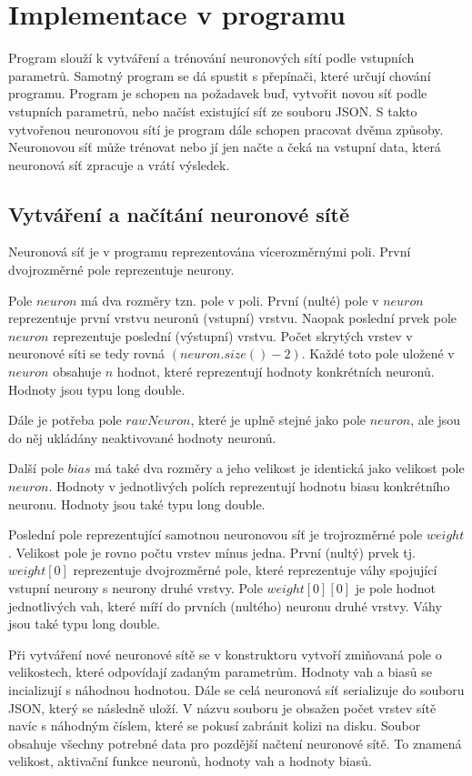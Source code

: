 \section{Implementace v programu}
Program slouží k vytváření a trénování neuronových sítí podle vstupních parametrů.
Samotný program se dá spustit s přepínači, které určují chování programu.
Program je schopen na požadavek buď, vytvořit novou síť podle vstupních parametrů, nebo načíst existující síť ze souboru JSON.
S takto vytvořenou neuronovou sítí je program dále schopen pracovat dvěma způsoby.
Neuronovou síť může trénovat nebo jí jen načte a čeká na vstupní data, která neuronová síť zpracuje a vrátí výsledek.

\subsection{Vytváření a načítání neuronové sítě}
Neuronová síť je v programu reprezentována vícerozměrnými poli. První dvojrozměrné pole reprezentuje neurony.

Pole \(neuron\) má dva rozměry tzn. pole v poli.
První (nulté) pole v \(neuron\) reprezentuje první vrstvu neuronů (vstupní) vrstvu.
Naopak poslední prvek pole \(neuron\) reprezentuje poslední (výstupní) vrstvu.
Počet skrytých vrstev v neuronové síti se tedy rovná \((neuron.size() - 2)\).
Každé toto pole uložené v \(neuron\) obsahuje \(n\) hodnot, které reprezentují hodnoty konkrétních neuronů. Hodnoty jsou typu long double.

Dále je potřeba pole \(rawNeuron\), které je uplně stejné jako pole \(neuron\), ale jsou do něj ukládány neaktivované hodnoty neuronů.

Další pole \(bias\) má také dva rozměry a jeho velikost je identická jako velikost pole \(neuron\).
Hodnoty v jednotlivých polích reprezentují hodnotu biasu konkrétního neuronu. Hodnoty jsou také typu long double.

Poslední pole reprezentující samotnou neuronovou síť je trojrozměrné pole \(weight\). Velikost pole je rovno počtu vrstev mínus jedna.
První (nultý) prvek tj. \(weight[0]\) reprezentuje dvojrozměrné pole, které reprezentuje váhy spojující vstupní neurony s neurony druhé vrstvy.
Pole \(weight[0][0]\) je pole hodnot jednotlivých vah, které míří do prvních (nultého) neuronu druhé vrstvy. Váhy jsou také typu long double.

Při vytváření nové neuronové sítě se v konstruktoru vytvoří zmiňovaná pole o velikostech, které odpovídají zadaným parametrům.
Hodnoty vah a biasů se incializují s náhodnou hodnotou. Dále se celá neuronová síť serializuje do souboru JSON, který se následně uloží.
V názvu souboru je obsažen počet vrstev sítě navíc s náhodným číslem, které se pokusí zabránit kolizi na disku.
Soubor obsahuje všechny potrebné data pro pozdější načtení neuronové sítě.
To znamená velikost, aktivační funkce neuronů, hodnoty vah a hodnoty biasů.

